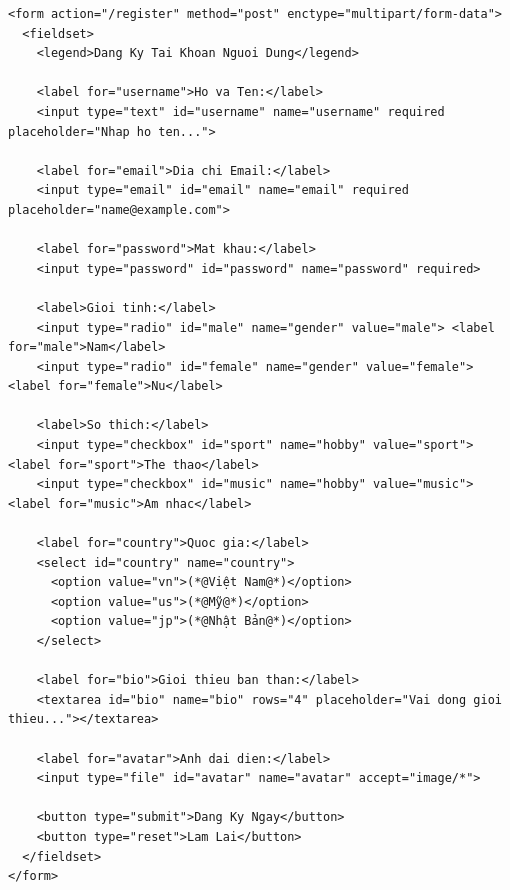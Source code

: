 \begin{codeWindowBreakable}
\begin{lstlisting}[language=HTML5]
<form action="/register" method="post" enctype="multipart/form-data">
  <fieldset>
    <legend>Dang Ky Tai Khoan Nguoi Dung</legend>
    
    <label for="username">Ho va Ten:</label>
    <input type="text" id="username" name="username" required placeholder="Nhap ho ten...">
    
    <label for="email">Dia chi Email:</label>
    <input type="email" id="email" name="email" required placeholder="name@example.com">
    
    <label for="password">Mat khau:</label>
    <input type="password" id="password" name="password" required>
    
    <label>Gioi tinh:</label>
    <input type="radio" id="male" name="gender" value="male"> <label for="male">Nam</label>
    <input type="radio" id="female" name="gender" value="female"> <label for="female">Nu</label>
    
    <label>So thich:</label>
    <input type="checkbox" id="sport" name="hobby" value="sport"> <label for="sport">The thao</label>
    <input type="checkbox" id="music" name="hobby" value="music"> <label for="music">Am nhac</label>
    
    <label for="country">Quoc gia:</label>
    <select id="country" name="country">
      <option value="vn">(*@Việt Nam@*)</option>
      <option value="us">(*@Mỹ@*)</option>
      <option value="jp">(*@Nhật Bản@*)</option>
    </select>
    
    <label for="bio">Gioi thieu ban than:</label>
    <textarea id="bio" name="bio" rows="4" placeholder="Vai dong gioi thieu..."></textarea>
    
    <label for="avatar">Anh dai dien:</label>
    <input type="file" id="avatar" name="avatar" accept="image/*">
    
    <button type="submit">Dang Ky Ngay</button>
    <button type="reset">Lam Lai</button>
  </fieldset>
</form>
\end{lstlisting}
\end{codeWindowBreakable}

